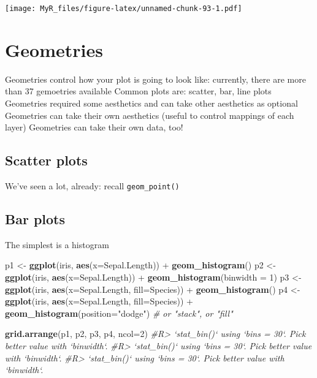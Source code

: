 \documentclass[]{book}
\newenvironment{Shaded}{}{}
\newcommand{\CommentTok}[1]{\textcolor[rgb]{0.38,0.63,0.69}{\textit{#1}}}
\newcommand{\DataTypeTok}[1]{\textcolor[rgb]{0.56,0.13,0.00}{#1}}
\newcommand{\DecValTok}[1]{\textcolor[rgb]{0.25,0.63,0.44}{#1}}
\newcommand{\KeywordTok}[1]{\textcolor[rgb]{0.00,0.44,0.13}{\textbf{#1}}}
\newcommand{\NormalTok}[1]{#1}
\newcommand{\OperatorTok}[1]{\textcolor[rgb]{0.40,0.40,0.40}{#1}}
\newcommand{\StringTok}[1]{\textcolor[rgb]{0.25,0.44,0.63}{#1}}
\theoremstyle{definition}
\theoremstyle{definition}
\theoremstyle{definition}
\theoremstyle{remark}
\begin{document}
\texttt{[image: MyR\_files/figure-latex/unnamed-chunk-93-1.pdf]}

\hypertarget{geometries-1}{%
\section{Geometries}\label{geometries-1}}

Geometries control how your plot is going to look like: currently, there
are more than 37 gemoetries available Common plots are: scatter, bar,
line plots Geometries required some aesthetics and can take other
aesthetics as optional Geometries can take their own aesthetics (useful
to control mappings of each layer) Geometries can take their own data,
too!

\hypertarget{scatter-plots}{%
\subsection{Scatter plots}\label{scatter-plots}}

We've seen a lot, already: recall \texttt{geom\_point()}

\hypertarget{bar-plots}{%
\subsection{Bar plots}\label{bar-plots}}

The simplest is a histogram

\begin{Shaded}
\begin{Highlighting}[]
\NormalTok{p1 <-}\StringTok{ }\KeywordTok{ggplot}\NormalTok{(iris, }\KeywordTok{aes}\NormalTok{(}\DataTypeTok{x=}\NormalTok{Sepal.Length)) }\OperatorTok{+}\StringTok{ }\KeywordTok{geom_histogram}\NormalTok{()}
\NormalTok{p2 <-}\StringTok{ }\KeywordTok{ggplot}\NormalTok{(iris, }\KeywordTok{aes}\NormalTok{(}\DataTypeTok{x=}\NormalTok{Sepal.Length)) }\OperatorTok{+}\StringTok{ }
\StringTok{      }\KeywordTok{geom_histogram}\NormalTok{(}\DataTypeTok{binwidth =} \DecValTok{1}\NormalTok{)}
\NormalTok{p3 <-}\StringTok{ }\KeywordTok{ggplot}\NormalTok{(iris, }\KeywordTok{aes}\NormalTok{(}\DataTypeTok{x=}\NormalTok{Sepal.Length, }\DataTypeTok{fill=}\NormalTok{Species)) }\OperatorTok{+}
\StringTok{      }\KeywordTok{geom_histogram}\NormalTok{()}
\NormalTok{p4 <-}\StringTok{ }\KeywordTok{ggplot}\NormalTok{(iris, }\KeywordTok{aes}\NormalTok{(}\DataTypeTok{x=}\NormalTok{Sepal.Length, }\DataTypeTok{fill=}\NormalTok{Species)) }\OperatorTok{+}
\StringTok{      }\KeywordTok{geom_histogram}\NormalTok{(}\DataTypeTok{position=}\StringTok{"dodge"}\NormalTok{) }\CommentTok{# or "stack", or "fill"}

\KeywordTok{grid.arrange}\NormalTok{(p1, p2, p3, p4,  }\DataTypeTok{ncol=}\DecValTok{2}\NormalTok{)}
\CommentTok{#R> `stat_bin()` using `bins = 30`. Pick better value with `binwidth`.}
\CommentTok{#R> `stat_bin()` using `bins = 30`. Pick better value with `binwidth`.}
\CommentTok{#R> `stat_bin()` using `bins = 30`. Pick better value with `binwidth`.}
\end{Highlighting}
\end{Shaded}
\end{document}

